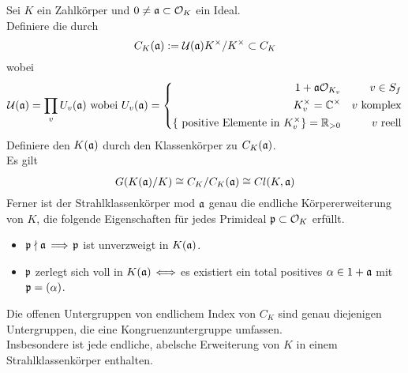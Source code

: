 Sei $K$ ein Zahlkörper und $0\neq \mathfrak{a} \subset \mathcal{O}_K$ ein Ideal.\\
Definiere die  durch
\[C_K(\mathfrak{a}) := \mathcal{U}(\mathfrak{a}) K^\times / K^\times \subset C_K \]
wobei
\[ \mathcal{U}(\mathfrak{a}) = \prod_{v} U_v(\mathfrak{a}) \text{ wobei } U_v(\mathfrak{a}) = \left\lbrace
\begin{aligned}
1 + \mathfrak{a} \mathcal{O}_{K_v} && v\in S_f\\
K^\times_v = \mathbb{C}^\times && v \text{ komplex}\\
\{\text{ positive Elemente in }K^\times_v\} = \mathbb{R}_{> 0} && v \text{ reell}
\end{aligned}
\right. \]
Definiere den  $K(\mathfrak{a})$ durch den Klassenkörper zu $C_K(\mathfrak{a})$.\\
Es gilt
\[ G(K(\mathfrak{a}) / K) \overset{}{\cong} C_K/C_K(\mathfrak{a}) \overset{}{\cong} Cl(K,\mathfrak{a})  \]
Ferner ist der Strahlklassenkörper mod $\mathfrak{a}$ genau die endliche Körpererweiterung von $K$, die folgende Eigenschaften für jedes Primideal $\mathfrak{p} \subset \mathcal{O}_K$ erfüllt.
\begin{itemize}
\item $\mathfrak{p}\nmid \mathfrak{a}$ $\overset{}{\Longrightarrow}$ $\mathfrak{p}$ ist unverzweigt in $K(\mathfrak{a})$.
\item $\mathfrak{p}$ zerlegt sich voll in $K(\mathfrak{a})$ $\overset{}{\Longleftrightarrow}$ es existiert ein total positives $\alpha \in 1 + \mathfrak{a}$ mit $\mathfrak{p} = (\alpha)$.
\end{itemize}

\Satz{}
Die offenen Untergruppen von endlichem Index von $C_K$ sind genau diejenigen Untergruppen, die eine Kongruenzuntergruppe umfassen.\\
Insbesondere ist jede endliche, abelsche Erweiterung von $K$ in einem Strahlklassenkörper enthalten.